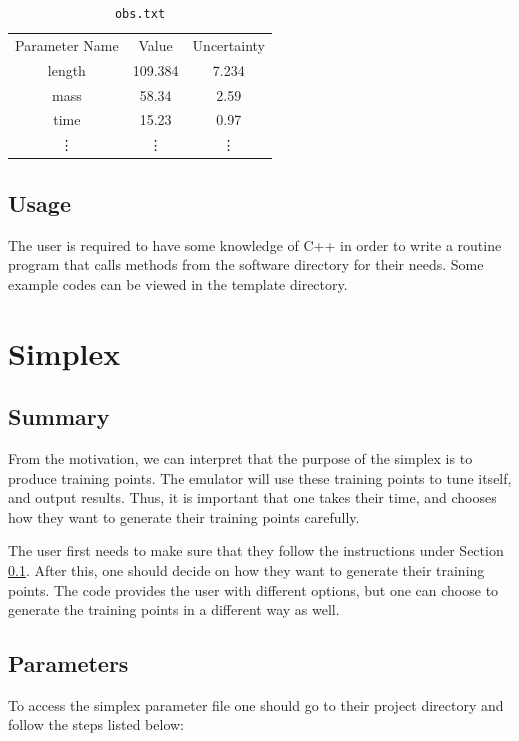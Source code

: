 \documentclass[12pt]{article}
\numberwithin{equation}{section}
\numberwithin{figure}{section}
\begin{document}
\begin{table}[!h]
    \centering
    \begin{tabular}{c|c|c}
         Parameter Name & Value & Uncertainty\\
         length & 109.384 & 7.234\\
         mass & 58.34 & 2.59 \\
         time & 15.23 & 0.97 \\
          \vdots & \vdots & \vdots
    \end{tabular}
    \caption{{\tt{obs.txt}}}
    \label{tab:my_label}
\end{table} 

\subsection{Usage}
\label{sec:Usage}

The user is required to have some knowledge of C++ in order to write a routine program that calls methods from the software directory for their needs. Some example codes can be viewed in the template directory.

\section{Simplex}

\subsection{Summary}
From the motivation, we can interpret that the purpose of the simplex is to produce training points. The emulator will use these training points to tune itself, and output results. Thus, it is important that one takes their time, and chooses how they want to generate their training points carefully.

The user first needs to make sure that they follow the instructions under Section \ref{sec:Usage}. After this, one should decide on how they want to generate their training points. The code provides the user with different options, but one can choose to generate the training points in a different way as well.

\subsection{Parameters}

To access the simplex parameter file one should go to their project directory and follow the steps listed below:
\end{document}
